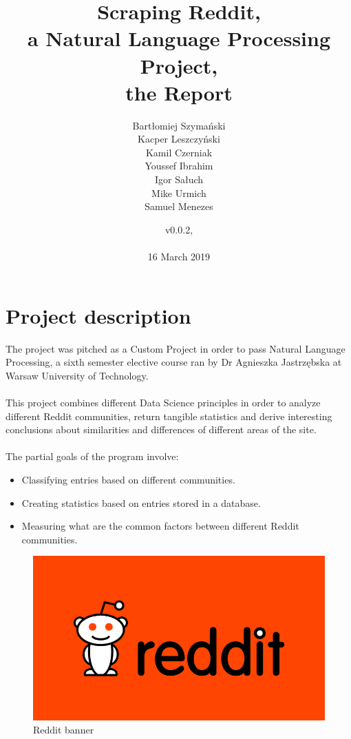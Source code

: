 \documentclass{article}
\title{Scraping Reddit, \\a Natural Language Processing Project,\\ the Report}
\author{Bartłomiej Szymański\\
Kacper Leszczyński\\
Kamil Czerniak\\
Youssef Ibrahim\\
Igor Sałuch\\
Mike Urmich\\
Samuel Menezes}
\date{v0.0.2, \\\\16 March 2019}
\begin{document}
\maketitle
\newpage
\tableofcontents
\newpage

\section{Project description}

The project was pitched as a Custom Project in order to pass Natural Language Processing, a sixth semester elective course ran by Dr Agnieszka Jastrzębska at Warsaw University of Technology. \\ \\
This project combines different Data Science principles in order to analyze different Reddit communities, return tangible statistics and derive interesting conclusions about similarities and differences of different areas of the site.\\ \\
The partial goals of the program involve:
\begin{itemize}
	\item Classifying entries based on different communities.
	\item Creating statistics based on entries stored in a database.
	\item Measuring what are the common factors between different Reddit communities.
\end{itemize}

\begin{figure}[htb!]
    \centering
    \includegraphics[width=\textwidth]{reddit_banner.png}
    \caption{Reddit banner}
    \label{fig:mesh1}
\end{figure}
\newpage
\end{document}
